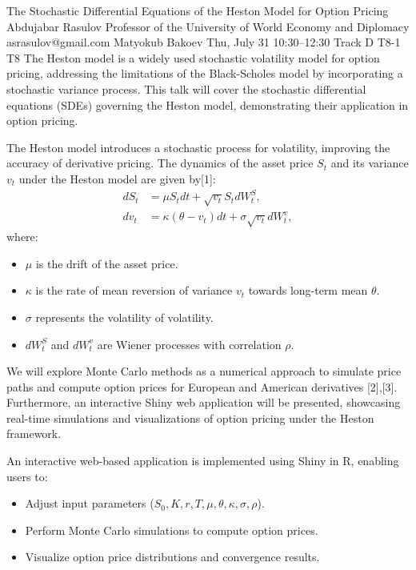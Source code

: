 \begin{talk}
  {The Stochastic Differential Equations of the Heston Model for Option Pricing}%
  {Abdujabar Rasulov}%
  {Professor of the University of World Economy and Diplomacy}%
  {asrasulov@gmail.com}%
  {Matyokub Bakoev}%
  {}%
  {Thu, July 31 10:30–12:30 Track D}%
  {T8-1}%
  {T8}%
The Heston model is a widely used stochastic volatility model for option pricing, addressing the limitations of the Black-Scholes model by incorporating a stochastic variance process. This talk will cover the stochastic differential equations (SDEs) governing the Heston model, demonstrating their application in option pricing. 

The Heston model introduces a stochastic process for volatility, improving the accuracy of derivative pricing. 
The dynamics of the asset price $S_t$ and its variance $v_t$ under the Heston model are given by[1]:
\begin{align}
    dS_t &= \mu S_t dt + \sqrt{v_t} S_t dW_t^S, \\
    dv_t &= \kappa(\theta - v_t) dt + \sigma \sqrt{v_t} dW_t^v,
\end{align}
where:
\begin{itemize}
    \item $\mu$ is the drift of the asset price.
    \item $\kappa$ is the rate of mean reversion of variance $v_t$ towards long-term mean $\theta$.
    \item $\sigma$ represents the volatility of volatility.
    \item $dW_t^S$ and $dW_t^v$ are Wiener processes with correlation $\rho$.
\end{itemize}

We will explore Monte Carlo methods as a numerical approach to simulate price paths and compute option prices for European and American derivatives [2],[3]. Furthermore, an interactive Shiny web application will be presented, showcasing real-time simulations and visualizations of option pricing under the Heston framework.

An interactive web-based application is implemented using Shiny in R, enabling users to:
\begin{itemize}
    \item Adjust input parameters ($S_0, K, r, T, \mu, \theta, \kappa, \sigma, \rho$).
    \item Perform Monte Carlo simulations to compute option prices.
    \item Visualize option price distributions and convergence results.
\end{itemize}


\end{talk}
